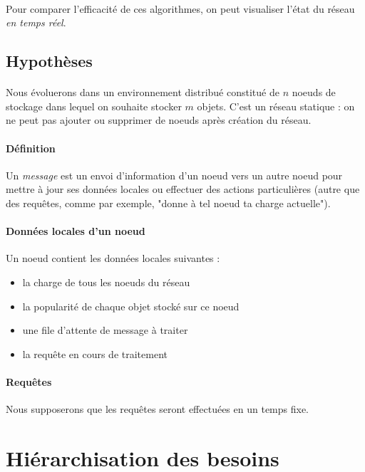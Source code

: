 \documentclass[12pt]{article}
\begin{document}
\paragraph{} Pour comparer l'efficacité de ces algorithmes, on peut visualiser l'état du réseau \textit{en temps réel}.


\subsection{Hypothèses}

\paragraph{} Nous évoluerons dans un environnement distribué constitué de $n$ noeuds de stockage dans lequel on souhaite stocker $m$ objets. C'est un réseau statique : on ne peut pas ajouter ou supprimer de noeuds après création du réseau.

\paragraph{Définition} Un \textit{message} est un envoi d'information d'un noeud vers un autre noeud pour mettre à jour ses données locales ou effectuer des actions particulières (autre que des requêtes, comme par exemple, "donne à tel noeud ta charge actuelle").

\paragraph{Données locales d'un noeud} Un noeud contient les données locales suivantes :
\begin{itemize}
 \item la charge de tous les noeuds du réseau
 \item la popularité de chaque objet stocké sur ce noeud
 \item une file d'attente de message à traiter
 \item la requête en cours de traitement
\end{itemize}

\paragraph{Requêtes} Nous supposerons que les requêtes seront effectuées en un temps fixe.

\section{Hiérarchisation des besoins}
\end{document}
